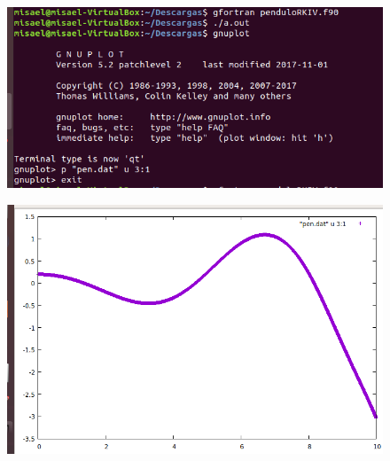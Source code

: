 \documentclass[12pt,a4paper]{article}
\begin{document}
\begin{figure}
    \centering
    \includegraphics[scale=0.8]{2.PNG}
\end{figure}

\begin{figure}[h]
    \centering
    \includegraphics[scale=0.8]{RKIV.PNG}
\end{figure}
\end{document}
